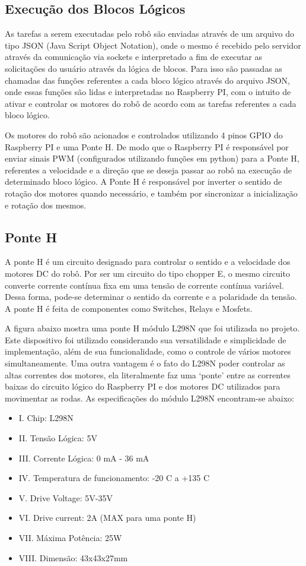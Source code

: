 \subsection{Execução dos Blocos Lógicos}

As tarefas a serem executadas pelo robô são enviadas através de um arquivo do tipo JSON (Java Script Object Notation), onde o mesmo é
recebido pelo servidor através da comunicação via sockets e interpretado a fim de executar as solicitações do usuário através da lógica
de blocos. Para isso são passadas as chamadas das funções referentes a cada bloco lógico através do arquivo JSON, onde essas funções são
lidas e interpretadas no Raspberry PI, com o intuito de ativar e controlar os motores do robô de acordo com as tarefas referentes a cada
bloco lógico.

Os motores do robô são acionados e controlados utilizando 4 pinos GPIO do Raspberry PI e uma Ponte H. De modo que o Raspberry PI é responsável
por enviar sinais PWM (configurados utilizando funções em python) para a Ponte H, referentes a velocidade e a direção que se deseja passar ao
robô na execução de determinado bloco lógico. A Ponte H é responsável por inverter o sentido de rotação dos motores quando necessário, e
também por sincronizar a inicialização e rotação dos mesmos.

\subsection{Ponte H}

A ponte H é um circuito designado para controlar o sentido e a velocidade dos motores DC do robô. Por ser um circuito do tipo chopper E, o mesmo circuito converte corrente contínua fixa em uma tensão de corrente contínua variável. Dessa forma, pode-se determinar o sentido da corrente e a polaridade da tensão. A ponte H é feita de componentes como Switches, Relays e Mosfets.

A figura abaixo mostra uma ponte H módulo L298N que foi utilizada no projeto. Este dispositivo foi utilizado considerando sua versatilidade e simplicidade de implementação, além de sua funcionalidade, como o controle de vários motores simultaneamente. Uma outra vantagem é o fato do L298N poder controlar as altas correntes dos motores, ela literalmente faz uma ‘ponte’ entre as correntes baixas do circuito lógico do Raspberry PI e dos motores DC utilizados para movimentar as rodas. As especificações do módulo L298N encontram-se abaixo:

\begin{itemize}
    \item I. Chip: L298N
    \item II. Tensão Lógica: 5V
    \item III. Corrente Lógica: 0 mA - 36 mA
    \item IV. Temperatura de funcionamento: -20 C a +135 C
    \item V. Drive Voltage: 5V-35V
    \item VI. Drive current: 2A (MAX para uma ponte H)
    \item VII. Máxima Potência: 25W
    \item VIII. Dimensão: 43x43x27mm
\end{itemize}

